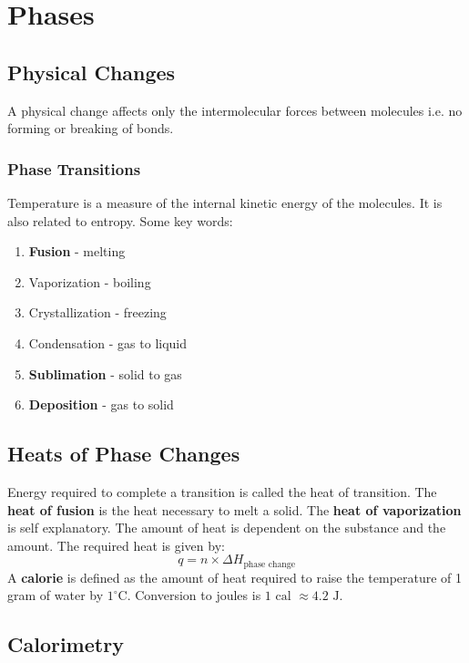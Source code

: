 \documentclass[../GChemReview.tex]{subfiles}
\begin{document}
	\chapter{Phases}
	
	\section{Physical Changes}
	
	A physical change affects only the intermolecular forces between molecules i.e. no forming or breaking of bonds.
	
	\subsection{Phase Transitions}
	
	Temperature is a measure of the internal kinetic energy of the molecules. It is also related to entropy. Some key words:
	\begin{enumerate}
		\item \textbf{Fusion} - melting
		\item Vaporization - boiling
		\item Crystallization - freezing
		\item Condensation - gas to liquid
		\item \textbf{Sublimation} - solid to gas
		\item \textbf{Deposition} - gas to solid
	\end{enumerate}
	
	\section{Heats of Phase Changes}
	
	Energy required to complete a transition is called the heat of transition. The \textbf{heat of fusion} is the heat necessary to melt a solid. The \textbf{heat of vaporization} is self explanatory. The amount of heat is dependent on the substance and the amount. The required heat is given by:
	\begin{equation}
		q = n\times\Delta H_{\text{phase change}}
	\end{equation}
	A \textbf{calorie} is defined as the amount of heat required to raise the temperature of 1 gram of water by $ 1^{\circ} $C. Conversion to joules is $ 1 \text{ cal } \approx 4.2 \text{ J} $.
	
	\section{Calorimetry}
	
\end{document}
